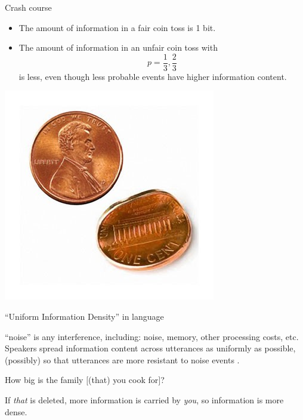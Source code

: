 \documentclass[hyperref={pdfpagelabels=false}]{beamer}
\begin{document}
\begin{frame}{Crash course} 
\begin{itemize}
	\item The amount of information in a fair coin toss is 1 bit.
	\item The amount of information in an unfair coin toss with $$p = \frac{1}{3}, \frac{2}{3}$$ is less, even though less probable events have higher information content.
\end{itemize}
\begin{center}
	\includegraphics[scale=0.4]{bentcoin.jpg}
\end{center}
\end{frame}





\begin{frame}{``Uniform Information Density'' in language} 
\begin{center}
	``noise'' is any interference, including: noise, memory, other processing costs, etc.\\\vspace*{5mm}
	Speakers spread information content across utterances as uniformly as possible, (possibly) so that utterances are more resistant to noise events \small{\citep{aylettturk2004,levyjaeger2007,levy2008a}}.
\end{center}
\begin{exe}
	\ex How big is the family $[$(that) you cook for$]$?
\end{exe}

\begin{center}
	If \textsl{that} is deleted, more information is carried by \textsl{you}, so information is more dense.
\end{center}


\end{frame}
\end{document}
